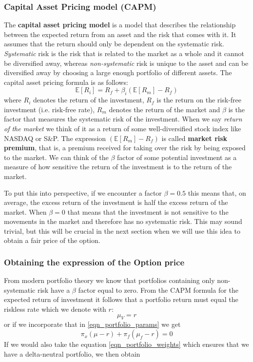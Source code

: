 \documentclass[times, utf8, diplomski]{fer}
\begin{document}
\subsubsection{Capital Asset Pricing model (CAPM)} %
The \textbf{capital asset pricing model} is a model that describes the relationship between the expected return from an asset and the risk that comes with it. It assumes that the return should only be dependent on the systematic risk. \textit{Systematic} risk is the risk that is related to the market as a whole and it cannot be diversified away, whereas \textit{non-systematic} risk is unique to the asset and can be diversified away by choosing a large enough portfolio of different assets. The capital asset pricing formula is as follows:
\begin{equation} \label{eqn_capm}
	\mathbb{E}[R_i] = R_f + \beta_i (\mathbb{E}[R_m] - R_f)
\end{equation}
where $R_i$ denotes the return of the investment, $R_f$ is the return on the risk-free investment (i.e. risk-free rate), $R_m$ denotes the return of the market and $\beta$ is the factor that measures the systematic risk of the investment. When we say \textit{return of the market} we think of it as a return of some well-diversified stock index like NASDAQ or S\&P. The expression $(\mathbb{E}[R_m] - R_f)$ is called \textbf{market risk premium}, that is, a premium received for taking over the risk by being exposed to the market. We can think of the $\beta$ factor of some potential investment as a measure of how sensitive the return of the investment is to the return of the market. 

\noindent To put this into perspective, if we encounter a factor $\beta = 0.5$ this means that, on average, the excess return of the investment is half the excess return of the market. When $\beta = 0$ that means that the investment is not sensitive to the movements in the market and therefore has no systematic risk. This may sound trivial, but this will be crucial in the next section when we will use this idea to obtain a fair price of the option.

\subsubsection{Obtaining the expression of the Option price}
From modern portfolio theory we know that portfolios containing only non-systematic risk have a $\beta$ factor equal to zero. From the CAPM formula for the expected return of investment it follows that a portfolio return must equal the riskless rate which we denote with $r$: $$ \mu_V = r $$ or if we incorporate that in \ref{eqn_portfolio_params} we get
\begin{equation} \label{eqn_comb_1}
	\pi_x(\mu - r) + \pi_f(\mu_f - r) = 0
\end{equation}
If we would also take the equation \ref{eqn_portfolio_weights} which ensures that we have a delta-neutral portfolio, we then obtain
\end{document}
